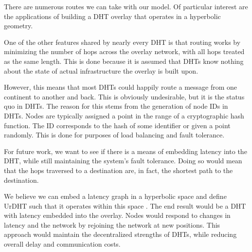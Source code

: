 
There are numerous routes we can take with our model.
Of particular interest are the applications of building a DHT overlay that operates in a hyperbolic geometry.

One of the other features shared by nearly every DHT is that routing works by minimizing the number of hops across the overlay network, with all hops treated as the same length.
This is done because it is assumed that DHTs know nothing about the state of actual infrastructure the overlay is built upon.

However, this means that most DHTs could happily route a message from one continent to another and back.
This is obviously undesirable, but it is the status quo in DHTs.
The reason for this stems from the generation of node IDs in DHTs. 
Nodes are typically assigned a point in the range of a cryptographic hash function. 
The ID corresponds to the hash of some identifier or given a point randomly.
This is done for purposes of load balancing and fault tolerance.

For future work, we want to see if there is a means of embedding latency into the DHT, while still maintaining the system's fault tolerance.
Doing so would mean that the hops traversed to a destination are, in fact, the shortest path to the destination.

We believe we can embed a latency graph in a hyperbolic space and define UrDHT such that it operates within this space \cite{kleinberg2007geographic} \cite{cvetkovski2009hyperbolic}.
The end result would be a DHT with latency embedded into the overlay.
Nodes would respond to changes in latency and the network by rejoining the network at new positions.
This approach would maintain the decentralized strengths of DHTs, while reducing overall delay and communication costs.



